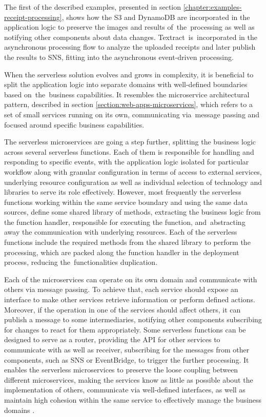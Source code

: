 The first of the described examples, presented in section \ref{chapter:examples-receipt-processing}, shows how the S3 and DynamoDB are incorporated in the application logic to preserve the images and results of~the~processing as well as notifying other components about data changes.
Textract~is~incorporated in the asynchronous processing flow to analyze the uploaded receipts and later publish the results to SNS, fitting into the asynchronous event-driven processing.

When the serverless solution evolves and grows in complexity, it is beneficial to split the application logic into separate domains with well-defined boundaries based on~the~business capabilities.
It resembles the microservice architectural pattern, described in section \ref{section:web-apps-microservices}, which refers to a set of small services running on its own, communicating via~message passing and focused around specific business capabilities.

The serverless microservices are going a step further, splitting the business logic across several serverless functions.
Each of them is responsible for handling and responding to specific events, with the application logic isolated for particular workflow along with granular configuration in terms of access to external services, underlying resource configuration as well as individual selection of technology and libraries to serve its role effectively.
However, most frequently the serverless functions working within the same service boundary and using the same data sources, define some shared library of methods, extracting the business logic from the function handler, responsible for executing the function, and~abstracting away the communication with underlying resources.
Each of the serverless functions include the required methods from the shared library to perform the processing, which are packed along the function handler in the deployment process, reducing the~functionalities duplication.

Each of the microservices can operate on its own domain and communicate with others via message passing.
To achieve that, each service should expose an interface to make other services retrieve information or perform defined actions.
Moreover, if the operation in one of the services should affect others, it can publish a message to some intermediaries, notifying other components subscribing for changes to react for them appropriately.
Some serverless functions can be designed to serve as a router, providing the API for other services to communicate with as well as receiver, subscribing for the messages from other components, such as SNS or EventBridge, to trigger the further processing.
It enables the serverless microservices to preserve the loose coupling between different microservices, making the services know as little as possible about the implementation of others, communicate via well-defined interfaces, as well as maintain high cohesion within the same service to effectively manage the business domains \cite{AnIntroductionToServerlessMicroservices}. \\

